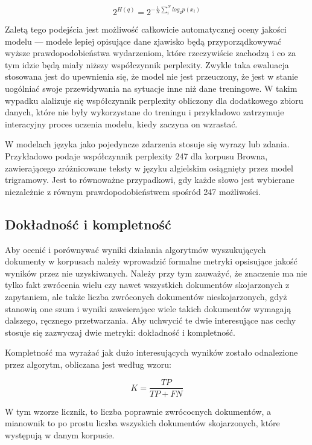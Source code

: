 \documentclass[11pt,a4paper]{article}
\begin{document}
\begin{equation}
  2^{H(q)} = 2^{-\frac{1}{N}\sum_i^N log_2 p(x_i)}
\end{equation}

Zaletą tego podejścia jest możliwość całkowicie automatycznej oceny jakości
modelu --- modele lepiej opisujące dane zjawisko będą przyporządkowywać wyższe
prawdopodobieństwa wydarzeniom, które rzeczywiście zachodzą i co za tym idzie
będą miały niższy współczynnik perplexity. Zwykle taka ewaluacja stosowana jest
do upewnienia się, że model nie jest przeuczony, że jest w stanie uogólniać
swoje przewidywania na sytuacje inne niż dane treningowe. W takim wypadku
alalizuje się współczynnik perplexity obliczony dla dodatkowego zbioru
danych, które nie były wykorzystane do treningu i przykładowo zatrzymuje
interacyjny proces uczenia modelu, kiedy zaczyna on wzrastać.

W modelach języka jako pojedyncze zdarzenia stosuje się wyrazy lub zdania.
Przykładowo \cite{perplexity-estimate} podaje współczynnik perplexity 247 dla
korpusu Browna, zawierającego zróżnicowane teksty w języku algielskim
osiągnięty przez model trigramowy. Jest to równoważne przypadkowi, gdy każde
słowo jest wybierane niezależnie z równym prawdopodobieństwem spośród 247
możliwości.

\subsection{Dokładność i kompletność}

Aby ocenić i porównywać wyniki działania algorytmów wyszukujących dokumenty w
korpusach należy wprowadzić formalne metryki opsisujące jakość wyników przez
nie uzyskiwanych. Należy przy tym zauważyć, że znaczenie ma nie tylko fakt
zwrócenia wielu czy nawet wszystkich dokumentów skojarzonych z zapytaniem, ale
także liczba zwróconych dokumentów nieskojarzonych, gdyż stanowią one szum i
wyniki zaweierające wiele takich dokumentów wymagają dalszego, ręcznego
przetwarzania. Aby uchwycić te dwie interesujące nas cechy stosuje się
zazwyczaj dwie metryki: dokładność i kompletność.

Kompletność ma wyrażać jak dużo interesujących wyników zostało odnalezione przez
algorytm, obliczana jest według wzoru:

\begin{equation}
  K = \frac{TP}{TP + FN}
\end{equation}

W tym wzorze licznik, to liczba poprawnie zwrócocnych dokumentów, a mianownik
to po prostu liczba wszyskich dokumentów skojarzonych, które występują w danym
korpusie.
\end{document}
